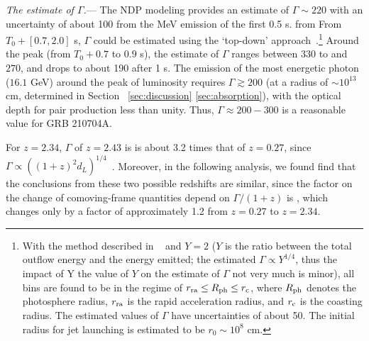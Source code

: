 \documentclass[linenumbers,twocolumn]{aastex631}
\providecommand{\DIFaddtex}[1]{{\protect\color{blue} \sf #1}} %
\providecommand{\DIFdeltex}[1]{{\protect\color{red} \scriptsize #1}} %
\providecommand{\DIFaddbegin}{} %
\providecommand{\DIFaddend}{} %
\providecommand{\DIFdelbegin}{} %
\providecommand{\DIFdelend}{} %
\providecommand{\DIFadd}[1]{\texorpdfstring{\DIFaddtex{#1}}{#1}} %
\providecommand{\DIFdel}[1]{\texorpdfstring{\DIFdeltex{#1}}{}} %
\begin{document}
\DIFdelend \textit{The estimate of $\Gamma$.}\label{sec:esti}---
The NDP modeling provides an estimate of $\Gamma\sim220$ with \DIFaddbegin \DIFadd{an }\DIFaddend uncertainty of about 100 from \DIFaddbegin \DIFadd{the }\DIFaddend MeV emission of the first 0.5 s. \DIFdelbegin \DIFdel{from }\DIFdelend \DIFaddbegin \DIFadd{From }\DIFaddend $T_0+[0.7,2.0]$ s, $\Gamma$ could be estimated using the `top-down' approach~\citep{2015ApJ...801..103G,2024ApJ...961..137S}.\footnote{With the method described in \DIFdelbegin \DIFdel{~}\DIFdelend \cite{2024ApJ...961..137S} and $Y=2$ ($Y$ is the ratio between the total outflow energy and the energy emitted; the estimated $\Gamma\propto Y^{1/4}$, thus the impact of \DIFdelbegin \DIFdel{Y }\DIFdelend \DIFaddbegin \DIFadd{the }\DIFaddend value \DIFaddbegin \DIFadd{of $Y$ }\DIFaddend on the estimate of $\Gamma$ \DIFdelbegin \DIFdel{not very much  }\DIFdelend \DIFaddbegin \DIFadd{is minor}\DIFaddend ), all bins are found to be in the regime of $r_{\rm ra}\leq R_{\rm ph}\leq r_{\rm c}$, where $R_{\rm ph}$ denotes the photosphere radius, $r_{\rm ra}$ is the rapid acceleration radius, and $r_{\rm c}$ is the coasting radius. The estimated values of $\Gamma$ have uncertainties of about 50. The initial radius for jet launching is estimated to be $r_0\sim10^{8}$ cm.} Around the peak (from $T_0+0.7$ to $0.9$ s), the estimate of $\Gamma$ ranges between $330$ \DIFdelbegin \DIFdel{to }\DIFdelend \DIFaddbegin \DIFadd{and }\DIFaddend $270$, and drops to about 190 after 1 s.
The emission of the most energetic photon ($16.1$ GeV) around the peak of luminosity requires $\Gamma \gtrsim 200$ (at a radius of $\sim10^{13}$ cm, determined in Section~\DIFdelbegin \DIFdel{\ref{sec:discussion}}\DIFdelend \DIFaddbegin \DIFadd{\ref{sec:absorption}}\DIFaddend ), with the optical depth for pair production less than unity. Thus, $\Gamma \approx 200-300$ is a reasonable value for GRB 210704A.%


\DIFaddbegin \DIFadd{For $z=2.34$, }\DIFaddend $\Gamma$ \DIFdelbegin \DIFdel{of $z=2.43$ is }\DIFdelend \DIFaddbegin \DIFadd{is about }\DIFaddend 3.2 times that of $z=0.27$, since $\Gamma\propto\left((1+z)^2d_L\right)^{1/4}$~\citep[e.g.,][]{2007ApJ...664L...1P}. Moreover, in the following analysis, we \DIFdelbegin \DIFdel{found }\DIFdelend \DIFaddbegin \DIFadd{find }\DIFaddend that the conclusions from these two possible redshifts are similar, since the \DIFdelbegin \DIFdel{factor on the change of }\DIFdelend \DIFaddbegin \DIFadd{comoving-frame quantities depend on }\DIFaddend $\Gamma/(1+z)$\DIFdelbegin \DIFdel{is }\DIFdelend \DIFaddbegin \DIFadd{, which changes only by a factor of }\DIFaddend approximately 1.2 from $z=0.27$ to $z=2.34$.
\end{document}
